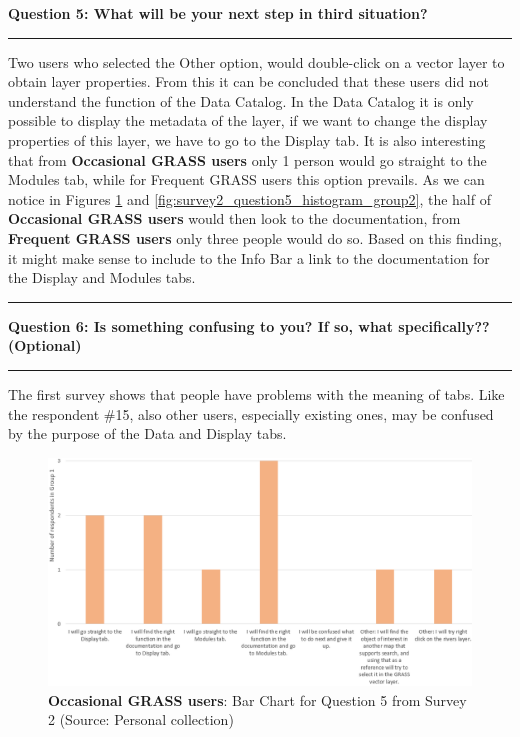 \documentclass[a4paper,10pt,twoside]{article}
\begin{document}
\newpage
\noindent \textbf{Question 5:  What will be your next step in third situation?}
\par\noindent\rule{\textwidth}{0.4pt}

\noindent Two users who selected the Other option, would double-click on a vector layer to obtain layer properties. From this it can be concluded that these users did not understand the function of the Data Catalog. In the Data Catalog it is only possible to display the metadata of the layer, if we want to change the display properties of this layer, we have to go to the Display tab. It is also interesting that from \textbf{Occasional GRASS users} only 1 person would go straight to the Modules tab, while for {Frequent GRASS users} this option prevails. As we can notice in Figures \ref{fig:survey2_question5_histogram_group1} and \ref{fig:survey2_question5_histogram_group2}, the half of \textbf{Occasional GRASS users} would then look to the documentation, from \textbf{Frequent GRASS users} only three people would do so. Based on this finding, it might make sense to include to the Info Bar a link to the documentation for the Display and Modules tabs.

\par\noindent\rule{\textwidth}{0.4pt}
\noindent \textbf{Question 6: Is something confusing to you? If so, what specifically?? (Optional)}
\par\noindent\rule{\textwidth}{0.4pt}

\noindent The first survey shows that people have problems with the meaning of tabs. Like the respondent \#15, also other users, especially existing ones, may be confused by the purpose of the Data and Display tabs.

\vspace{0.3cm}
\begin{figure}[hbt!] 
\begin{center}
\includegraphics[width=17cm]{../surveys/analyzed_data/survey2_question5_histogram_group1.png} 
\caption[\textbf{Occasional GRASS users}: Bar Chart for Question 5 from Survey 2]{\textbf{Occasional GRASS users}: Bar Chart for Question 5 from Survey 2 (Source: Personal collection)}
\label{fig:survey2_question5_histogram_group1}
\end{center}
\end{figure}
\end{document}
